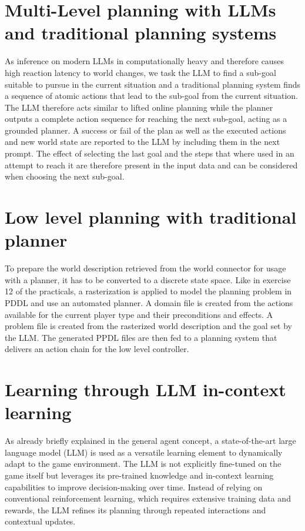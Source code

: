 \documentclass{article}
\begin{document}
\section{Multi-Level planning with LLMs and traditional planning systems}

As inference on modern LLMs in computationally heavy and therefore causes high reaction latency to world changes, we task the LLM to find a sub-goal suitable to pursue in the current situation and a traditional planning system finds a sequence of atomic actions that lead to the sub-goal from the current situation. The LLM therefore acts similar to lifted online planning while the planner outputs a complete action sequence for reaching the next sub-goal, acting as a grounded planner. A success or fail of the plan as well as the executed actions and new world state are reported to the LLM by including them in the next prompt. The effect of selecting the last goal and the steps that where used in an attempt to reach it are therefore present in the input data and can be considered when choosing the next sub-goal.

\section{Low level planning with traditional planner}

To prepare the world description retrieved from the world connector for usage with a planner, it has to be converted to a discrete state space. Like in exercise 12 of the practicals, a rasterization is applied to model the planning problem in PDDL and use an automated planner. A domain file is created from the actions available for the current player type and their preconditions and effects. A problem file is created from the rasterized world description and the goal set by the LLM. The generated PPDL files are then fed to a planning system that delivers an action chain for the low level controller.

\section{Learning through LLM in-context learning}
As already briefly explained in the general agent concept, a state-of-the-art large language model (LLM) is used as a versatile learning element 
to dynamically adapt to the game environment. 
The LLM is not explicitly fine-tuned on the game itself but leverages its pre-trained knowledge and in-context learning capabilities 
to improve decision-making over time. Instead of relying on conventional reinforcement learning, 
which requires extensive training data and rewards, the LLM refines its planning through repeated interactions and contextual updates.
\end{document}
